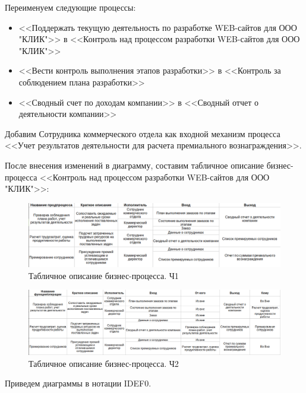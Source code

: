 \documentclass[a4paper,14pt]{extarticle}
\begin{document}
Переименуем следующие процессы:
\begin{itemize}
	\item <<Поддержать текущую деятельность по разработке WEB-сайтов для ООО "КЛИК">> в <<Контроль над процессом разработки WEB-сайтов для ООО "КЛИК">>
	\item <<Вести контроль выполнения этапов разработки>> в <<Контроль за соблюдением плана разработки>>
	\item <<Сводный счет по доходам компании>> в <<Сводный отчет о деятельности компании>>
\end{itemize}
Добавим Сотрудника коммерческого отдела как входной механизм процесса <<Учет результатов деятельности для расчета премиального вознаграждения>>.

После внесения изменений в диаграмму, составим табличное описание бизнес-процесса <<Контроль над процессом разработки WEB-сайтов для ООО "КЛИК">>:

	
\begin{figure}[h!]
	\centering
	\includegraphics[width=\linewidth]{images/table1Pr6}
	\caption{Табличное описание бизнес-процесса. Ч1}
	\label{fig:table1pr6}
\end{figure}


\begin{figure}[h!]
	\centering
	\includegraphics[width=1\linewidth]{images/table2Pr6}
	\caption{Табличное описание бизнес-процесса. Ч2}
	\label{fig:table2pr6}
\end{figure}

Приведем диаграммы в нотации IDEF0.
\end{document}
